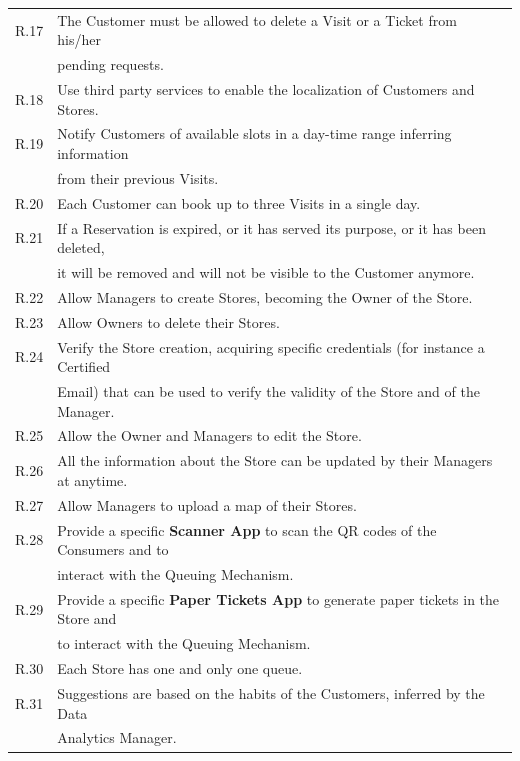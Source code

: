 \documentclass[a4paper, 12pt, oneside, table]{article}
\begin{document}
\begin{tabularx}{\linewidth}{| o || l |}
    \hline
    R.17 & The Customer must be allowed to delete a Visit or a Ticket from his/her\\
    & pending requests.\\
    \hline
    R.18 & Use third party services to enable the localization of Customers and Stores. \\
    \hline
    R.19 & Notify Customers of available slots in a day-time range inferring information\\
    & from their previous Visits.\\
    \hline
    R.20 & Each Customer can book up to three Visits in a single day.\\
    \hline
    R.21 & If a Reservation is expired, or it has served its purpose, or it has been deleted,\\
    & it will be removed and will not be visible to the Customer anymore.\\
    \hline
    R.22 & Allow Managers to create Stores, becoming the Owner of the Store.\\
    \hline
    R.23 & Allow Owners to delete their Stores.\\
    \hline
    R.24 & Verify the Store creation, acquiring specific credentials (for instance a Certified\\
    & Email) that can be used to verify the validity of the Store and of the Manager.\\
    \hline
    R.25 & Allow the Owner and Managers to edit the Store.\\
    \hline
    R.26 & All the information about the Store can be updated by their Managers at anytime.\\
    \hline
    R.27 & Allow Managers to upload a map of their Stores.\\
    \hline
    R.28 & Provide a specific \textbf{Scanner App} to scan the QR codes of the Consumers and to\\
    & interact with the Queuing Mechanism.\\
    \hline
    R.29 & Provide a specific \textbf{Paper Tickets App} to generate paper tickets in the Store and\\
    & to interact with the Queuing Mechanism.\\
    \hline
    R.30 & Each Store has one and only one queue.\\
    \hline
    R.31 & Suggestions are based on the habits of the Customers, inferred by the Data\\
    & Analytics Manager.\\
    \hline
    
\end{tabularx}
\end{document}
